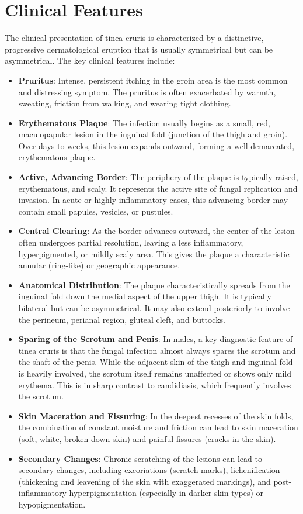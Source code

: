 \section*{Clinical Features}
The clinical presentation of tinea cruris is characterized by a distinctive, progressive dermatological eruption that is usually symmetrical but can be asymmetrical. The key clinical features include:
\begin{itemize}
    \item \textbf{Pruritus}: Intense, persistent itching in the groin area is the most common and distressing symptom. The pruritus is often exacerbated by warmth, sweating, friction from walking, and wearing tight clothing.
    \item \textbf{Erythematous Plaque}: The infection usually begins as a small, red, maculopapular lesion in the inguinal fold (junction of the thigh and groin). Over days to weeks, this lesion expands outward, forming a well-demarcated, erythematous plaque.
    \item \textbf{Active, Advancing Border}: The periphery of the plaque is typically raised, erythematous, and scaly. It represents the active site of fungal replication and invasion. In acute or highly inflammatory cases, this advancing border may contain small papules, vesicles, or pustules.
    \item \textbf{Central Clearing}: As the border advances outward, the center of the lesion often undergoes partial resolution, leaving a less inflammatory, hyperpigmented, or mildly scaly area. This gives the plaque a characteristic annular (ring-like) or geographic appearance.
    \item \textbf{Anatomical Distribution}: The plaque characteristically spreads from the inguinal fold down the medial aspect of the upper thigh. It is typically bilateral but can be asymmetrical. It may also extend posteriorly to involve the perineum, perianal region, gluteal cleft, and buttocks.
    \item \textbf{Sparing of the Scrotum and Penis}: In males, a key diagnostic feature of tinea cruris is that the fungal infection almost always spares the scrotum and the shaft of the penis. While the adjacent skin of the thigh and inguinal fold is heavily involved, the scrotum itself remains unaffected or shows only mild erythema. This is in sharp contrast to candidiasis, which frequently involves the scrotum.
    \item \textbf{Skin Maceration and Fissuring}: In the deepest recesses of the skin folds, the combination of constant moisture and friction can lead to skin maceration (soft, white, broken-down skin) and painful fissures (cracks in the skin).
    \item \textbf{Secondary Changes}: Chronic scratching of the lesions can lead to secondary changes, including excoriations (scratch marks), lichenification (thickening and leavening of the skin with exaggerated markings), and post-inflammatory hyperpigmentation (especially in darker skin types) or hypopigmentation.
\end{itemize}


